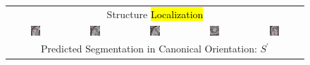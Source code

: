 \begin{figure}
\begin{center}
\begin{tabular}{ccccc}
\multicolumn{5}{c}{Structure \hl{Localization}} \\

\includegraphics[width=0.19\textwidth]{./data/representative-results/control/HCMNet_2600035/00_SAX/BASE/0_bbox.png} &
\includegraphics[width=0.19\textwidth]{./data/representative-results/control/HCMNet_2600035/00_SAX/MID/0_bbox.png} &
\includegraphics[width=0.19\textwidth]{./data/representative-results/control/HCMNet_2600035/00_SAX/APEX/0_bbox.png} &
\includegraphics[width=0.19\textwidth]{./data/representative-results/control/HCMNet_1700012/01_HLA/00/0_bbox.png} &
\includegraphics[width=0.19\textwidth]{./data/representative-results/control/HCMNet_1700012/02_VLA/00/0_bbox.png} \\

\multicolumn{5}{c}{Predicted Segmentation in Canonical Orientation: $S^\prime$} \\


\end{tabular}
\end{center}
\end{figure}
